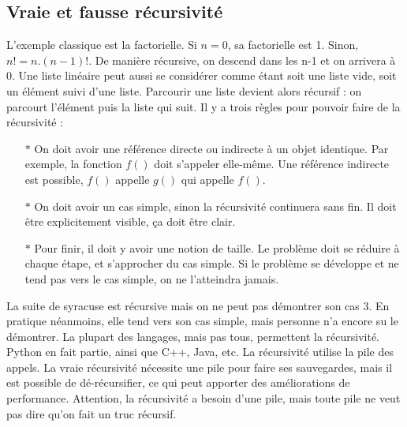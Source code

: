 \documentclass[10pt]{article}
\begin{document}
\subsection{Vraie et fausse récursivité}
L'exemple classique est la factorielle. Si $n = 0$, sa factorielle est 1. Sinon, $n ! = n.(n-1) ! $. De manière récursive, on descend dans les n-1 et on arrivera à 0.  
\newline \newline 
Une liste linéaire peut aussi se considérer comme étant soit une liste vide, soit un élément suivi d'une liste. Parcourir une liste devient alors récursif : on parcourt l'élément puis la liste qui suit.  
\newline \newline 
Il y a trois règles pour pouvoir faire de la récursivité :  
\begin{itemize}

		\item[$*$]On doit avoir une référence directe ou indirecte à un objet identique. Par exemple, la fonction $f()$ doit s'appeler elle-même. Une référence indirecte est possible, $f()$ appelle $g()$ qui appelle $f()$. 

		\item[$*$]On doit avoir un cas simple, sinon la récursivité continuera sans fin. Il doit être explicitement visible, ça doit être clair.

		\item[$*$]Pour finir, il doit y avoir une notion de taille. Le problème doit se réduire à chaque étape, et s'approcher du cas simple. Si le problème se développe et ne tend pas vers le cas simple, on ne l'atteindra jamais.
\end{itemize}
La suite de syracuse est récursive mais on ne peut pas démontrer son cas 3. En pratique néanmoins, elle tend vers son cas simple, mais personne n'a encore su le démontrer. 
\newline \newline 
La plupart des langages, mais pas tous, permettent la récursivité. Python en fait partie, ainsi que C++, Java, etc. 
\newline \newline 
La récursivité utilise la pile des appels. La vraie récursivité nécessite une pile pour faire ses sauvegardes, mais il est possible de dé-récursifier, ce qui peut apporter des améliorations de performance. Attention, la récursivité a besoin d'une pile, mais toute pile ne veut pas dire qu'on fait un truc récursif. 
\newline \newline 
\end{document}
